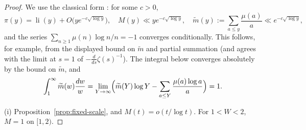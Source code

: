 \documentclass[11pt]{amsart}
\numberwithin{equation}{section}
\theoremstyle{plain}
\theoremstyle{definition}
\theoremstyle{remark}
\DeclareMathOperator{\li}{li}
\newcommand{\mt}{\widetilde{m}}
\begin{document}
\begin{proof}
We use the classical form \cite{MontgomeryVaughan2007}: for some $c>0$,
\begin{equation}
\label{eq:pnt_inputs}
  \pi(y)=\li(y)+O\bigl(ye^{-c\sqrt{\log y}}\bigr),\quad
  M(y)\ll ye^{-c\sqrt{\log y}},\quad
  \mt(y):=\sum_{a\le y}\frac{\mu(a)}a\ll e^{-c\sqrt{\log y}},
\end{equation}
and the series
$\sum_{n\ge1}\mu(n)\log n/n=-1$ converges conditionally.  This follows,
for example, from the displayed bound on $\mt$ and partial summation (and
agrees with the limit at $s=1$ of
$-\frac{d}{ds}\zeta(s)^{-1}$).  The integral below converges absolutely by
the bound on $\mt$, and
\begin{equation}
\label{eq:mtilde_integral}
  \int_1^\infty\mt(w)\frac{dw}w
  =\lim_{Y\to\infty}\Bigl(\mt(Y)\log Y-\sum_{a\le Y}\frac{\mu(a)\log a}a\Bigr)=1.
\end{equation}

(i) Proposition~\ref{prop:fixed-scale}, and $M(t)=o(t/\log t)$. For
$1<W<2$, $M=1$ on $[1,2)$.


\end{proof}
\end{document}
